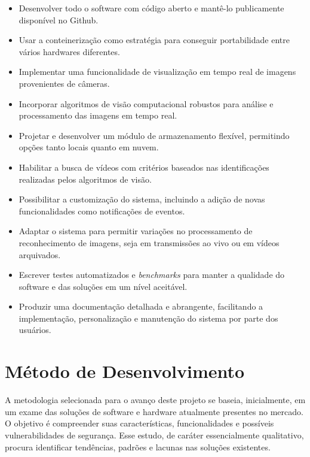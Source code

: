 \documentclass[12pt, %
openright, 
oneside, %
a4paper,    %
brazil]{facom-ufu-abntex2}
\begin{document}
\begin{itemize}
	\item Desenvolver todo o software com código aberto e mantê-lo publicamente
	      disponível no Github.
	\item Usar a conteinerização como estratégia para conseguir portabilidade entre
	      vários hardwares diferentes.
	\item Implementar uma funcionalidade de visualização em tempo real de imagens
	      provenientes de câmeras.
	\item Incorporar algoritmos de visão computacional robustos para análise e
	      processamento das imagens em tempo real.
	\item Projetar e desenvolver um módulo de armazenamento flexível, permitindo opções
	      tanto locais quanto em nuvem.
	\item Habilitar a busca de vídeos com critérios baseados nas identificações
	      realizadas pelos algoritmos de visão.
	\item Possibilitar a customização do sistema, incluindo a adição de novas
	      funcionalidades como notificações de eventos.
	\item Adaptar o sistema para permitir variações no processamento de reconhecimento de
	      imagens, seja em transmissões ao vivo ou em vídeos arquivados.
	\item Escrever testes automatizados e \textit{\foreignlanguage{english}{benchmarks}}
	      para manter a qualidade do software e das soluções em um nível aceitável.
	\item Produzir uma documentação detalhada e abrangente, facilitando a implementação,
	      personalização e manutenção do sistema por parte dos usuários.
\end{itemize}


\chapter{Método de Desenvolvimento}

A metodologia selecionada para o avanço deste projeto se baseia, inicialmente,
em um exame das soluções de software e hardware atualmente presentes no
mercado. O objetivo é compreender suas características, funcionalidades e
possíveis vulnerabilidades de segurança. Esse estudo, de caráter essencialmente
qualitativo, procura identificar tendências, padrões e lacunas nas soluções
existentes.
\end{document}
